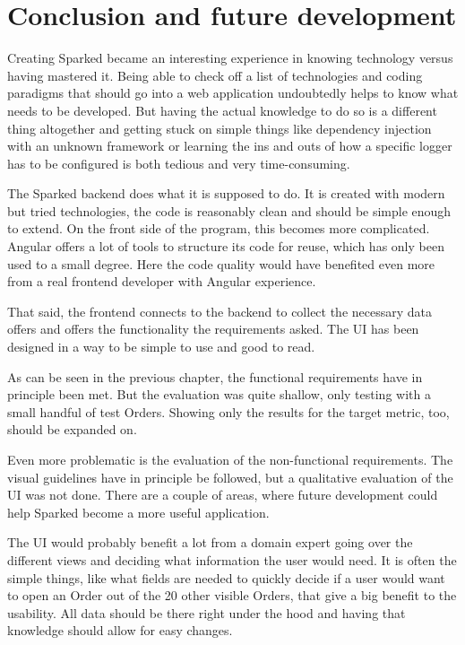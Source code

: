 \chapter{Conclusion and future development}
Creating Sparked became an interesting experience in knowing technology versus having mastered it. Being able to check off a list of technologies and coding paradigms that should go into a web application undoubtedly helps to know what needs to be developed. But having the actual knowledge to do so is a different thing altogether and getting stuck on simple things like dependency injection with an unknown framework or learning the ins and outs of how a specific logger has to be configured is both tedious and very time-consuming. 

The Sparked backend does what it is supposed to do. It is created with modern but tried technologies, the code is reasonably clean and should be simple enough to extend. On the front side of the program, this becomes more complicated. Angular offers a lot of tools to structure its code for reuse, which has only been used to a small degree. Here the code quality would have benefited even more from a real frontend developer with Angular experience. 

That said, the frontend connects to the backend to collect the necessary data offers and offers the functionality the requirements asked. The UI has been designed in a way to be simple to use and good to read. 

As can be seen in the previous chapter, the functional requirements have in principle been met. But the evaluation was quite shallow, only testing with a small handful of test Orders. Showing only the results for the target metric, too, should be expanded on. 

Even more problematic is the evaluation of the non-functional requirements. The visual guidelines have in principle be followed, but a qualitative evaluation of the UI was not done.
There are a couple of areas, where future development could help Sparked become a more useful application.

The UI would probably benefit a lot from a domain expert going over the different views and deciding what information the user would need. It is often the simple things, like what fields are needed to quickly decide if a user would want to open an Order out of the 20 other visible Orders, that give a big benefit to the usability. All data should be there right under the hood and having that knowledge should allow for easy changes.

